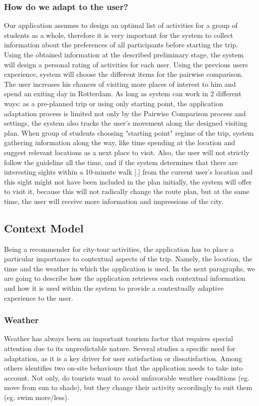 \documentclass[11pt,a4paper,oneside]{article}
\begin{document}
\subsubsection{How do we adapt to the user?}
Our application assumes to design an optimal list of activities for a group of students as a whole, therefore it is very important for the system to collect information about the preferences of all participants before starting the trip. Using the obtained information at the described preliminary stage, the system will design a personal rating of activities for each user. Using the previous users experience, system will choose the different items for the pairwise comparison. The user increases his chances of visiting more places of interest to him and spend an exiting day in Rotterdam. As long as system can work in 2 different ways: as a pre-planned trip or using only starting point, the application adaptation process is limited not only by the Pairwise Comparison process and settings, the system also tracks the user's movement along the designed visiting plan. When group of students choosing "starting point" regime of the trip, system gathering information along the way, like time spending at the location and suggest relevant locations as a next place to visit. Also, the user will not strictly follow the guideline all the time, and if the system determines that there are interesting sights within a 10-minute walk [.\cite{ton_CyclingWalkingDeterminants_2019}] from the current user's location and this sight might not have been included in the plan initially, the system will offer to visit it, because this will not radically change the route plan, but at the same time, the user will receive more information and impressions of the city.
\subsection{Context Model}
\label{context}
Being a recommender for city-tour activities, the application has to place a particular importance to contextual aspects of the trip. Namely, the location, the time and the weather in which the application is used. In the next paragraphs, we are going to describe how the application retrieves each contextual information and how it is used within the system to provide a contextually adaptive experience to the user.



\subsubsection{Weather}
Weather has always been an important tourism factor that requires special attention due to its unpredictable nature. Several studies a specific need for adaptation, as it is a key driver for user satisfaction or dissatisfaction.\cite{becken_ImportanceClimateWeather_2010} Among others \citeauthor{defreitas_TourismClimatologyEvaluating_2003} identifies two on-site behaviours that the application needs to take into account. Not only, do tourists want to avoid unfavorable weather conditions (eg. move from sun to shade), but they change their activity accordingly to suit them (eg. swim more/less). 
\end{document}
